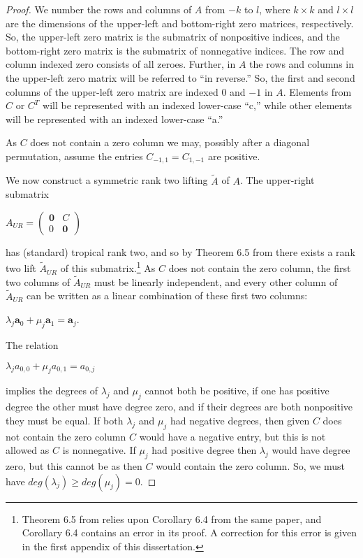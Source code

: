 \documentclass{article}
\begin{document}
\begin{proof}
  We number the rows and columns of $A$ from $-k$ to $l$, where $k \times k$ and $l \times l$ are the dimensions of the upper-left and bottom-right zero matrices, respectively. So, the upper-left zero matrix is the submatrix of nonpositive indices, and the bottom-right zero matrix is the submatrix of nonnegative indices. The row and column indexed zero consists of all zeroes. Further, in $A$ the rows and columns in the upper-left zero matrix will be referred to ``in reverse.'' So, the first and second columns of the upper-left zero matrix are indexed $0$ and $-1$ in $A$. Elements from $C$ or $C^{T}$ will be represented with an indexed lower-case ``c,'' while other elements will be represented with an indexed lower-case ``a.''
  
  As $C$ does not contain a zero column we may, possibly after a diagonal permutation, assume the entries $C_{-1,1} = C_{1,-1}$ are positive.

  We now construct a symmetric rank two lifting $\tilde{A}$ of $A$. The upper-right submatrix
  \begin{center}
    $A_{UR} = \left(\begin{array}{cc} \textbf{0} & C \\ 0 & \textbf{0} \end{array}\right)$
  \end{center}  
  has (standard) tropical rank two, and so by Theorem 6.5 from \cite{dss} there exists a rank two lift $\tilde{A}_{UR}$ of this submatrix.\footnote{Theorem 6.5 from \cite{dss} relies upon Corollary 6.4 from the same paper, and Corollary 6.4 contains an error in its proof. A correction for this error is given in the first appendix of this dissertation.} As $C$ does not contain the zero column, the first two columns of $\tilde{A}_{UR}$ must be linearly independent, and every other column of $\tilde{A}_{UR}$ can be written as a linear combination of these first two columns:
  \begin{center}
    $\lambda_{j}\textbf{a}_{0} + \mu_{j}\textbf{a}_{1} = \textbf{a}_{j}$.
  \end{center}
 
  The relation
  \begin{center}
    $\lambda_{j}a_{0,0} + \mu_{j}a_{0,1} = a_{0,j}$
  \end{center}
  implies the degrees of $\lambda_{j}$ and $\mu_{j}$ cannot both be positive, if one has positive degree the other must have degree zero, and if their degrees are both nonpositive they must be equal. If both $\lambda_{j}$ and $\mu_{j}$ had negative degrees, then given $C$ does not contain the zero column $C$ would have a negative entry, but this is not allowed as $C$ is nonnegative. If $\mu_{j}$ had positive degree then $\lambda_{j}$ would have degree zero, but this cannot be as then $C$ would contain the zero column. So, we must have $deg(\lambda_{j}) \geq deg(\mu_{j}) = 0$. 
  

\end{proof}
\end{document}
